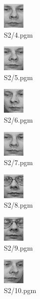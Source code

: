 \documentclass[dvipsnames]{article}
\begin{document}
\begin{multicols}{3}
\begin{figure}[H]
	\centering\includegraphics{Out-JPG/S2/4.jpg}
	\caption{S2/4.pgm}
\end{figure}

\begin{figure}[H]
	\centering\includegraphics{Out-JPG/S2/5.jpg}
	\caption{S2/5.pgm}
\end{figure}

\begin{figure}[H]
	\centering\includegraphics{Out-JPG/S2/6.jpg}
	\caption{S2/6.pgm}
\end{figure}

\begin{figure}[H]
	\centering\includegraphics{Out-JPG/S2/7.jpg}
	\caption{S2/7.pgm}
\end{figure}

\begin{figure}[H]
	\centering\includegraphics{Out-JPG/S2/8.jpg}
	\caption{S2/8.pgm}
\end{figure}

\begin{figure}[H]
	\centering\includegraphics{Out-JPG/S2/9.jpg}
	\caption{S2/9.pgm}
\end{figure}

\begin{figure}[H]
	\centering\includegraphics{Out-JPG/S2/10.jpg}
	\caption{S2/10.pgm}
\end{figure}

\vfill\null
\end{multicols}
\end{document}
